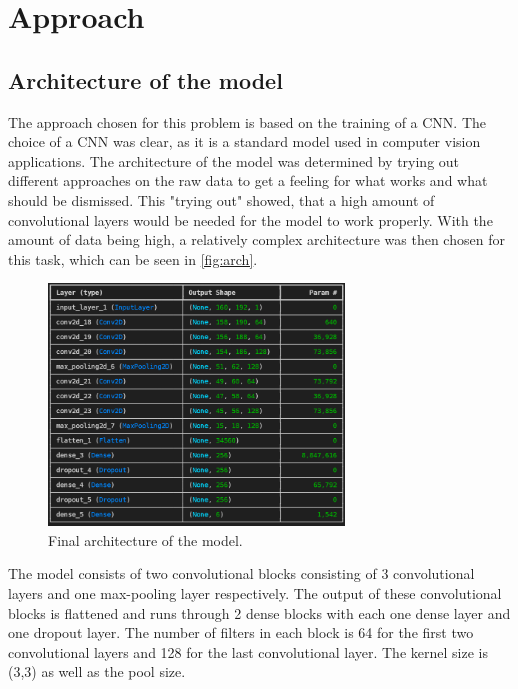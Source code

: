 \section{Approach}
    \label{sec:1}
\subsection{Architecture of the model}
The approach chosen for this problem is based on the training of a CNN. The choice of a CNN was clear, as it is a standard model used in computer vision applications. The architecture of the model was determined by trying out different approaches on the raw data to get a feeling for what works and what should be dismissed. This "trying out" showed, that a high amount of convolutional layers would be needed for the model to work properly. With the amount of data being high, a relatively complex architecture was then chosen for this task, which can be seen in
\autoref{fig:arch}.
\begin{figure}[H]
    \centering
    \includegraphics[width=0.7\textwidth]{content/arch.png}
    \caption{Final architecture of the model.}
    \label{fig:arch}
\end{figure}
\noindent
The model consists of two convolutional blocks consisting of 3 convolutional layers and one max-pooling layer respectively. The output of these convolutional blocks is flattened and runs through 2 dense blocks with each one dense layer and one dropout layer.
The number of filters in each block is 64 for the first two convolutional layers and 128 for the last convolutional layer. The kernel size is (3,3) as well as the pool size. 
